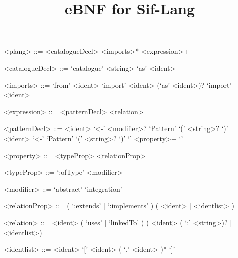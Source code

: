 \documentclass[pdftex]{article}
\title{eBNF for Sif-Lang}
\begin{document}
\maketitle
    

\begin{grammar}
<plang> ::= <catalogueDecl> <imports>* <expression>+


<catalogueDecl> ::= `catalogue' <string> `as' <ident>


<imports> ::= `from' <ident> `import' <ident> (`as' <ident>)?
  \alt `import' <ident>


<expression> ::= <patternDecl>
\alt <relation>

<patternDecl> ::= <ident> `<-' <modifier>? `Pattern' `(' <string>? `)'
\alt <ident> `<-' `Pattern' `(' <string>? `)' `{' <property>+ `}'


<property> ::= <typeProp>
\alt <relationProp>


<typeProp> ::= `:ofType' <modifier>

<modifier> ::= `abstract' \alt `integration'

<relationProp> ::= ( `:extends' | `:implements' ) ( <ident> | <identlist> )

<relation> ::= <ident> ( `uses' | `linkedTo' ) ( <ident> ( `:' <string>)? | <identlist>)

<identlist> ::= <ident>  \alt `[' <ident> ( `,' <ident> )* `]'

\end{grammar}
\end{document}
